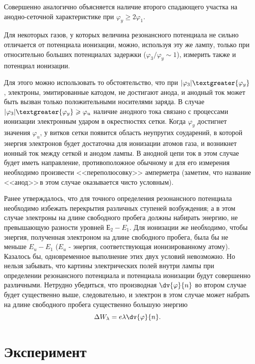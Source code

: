 Совершенно аналогично объясняется наличие второго спадающего участка на анодно-сеточной характеристике при $\varphi_{y}\geqslant2\varphi_{1}$.

Для некоторых газов, у которых величина резонансного потенциала не сильно отличается от потенциала ионизации, можно, используя эту же лампу, только при относительно больших потенциалах задержки ($\varphi_{3} /\varphi_{y} \sim1$), измерить также и потенциал ионизации.

Для этого можно использовать то обстоятельство, что при $|\varphi_{3}|\textgreater{\varphi_{y}}$, электроны, эмитированные катодом, не достигают анода, и анодный ток может быть вызван только положительными носителями заряда. В случае $|\varphi_{3}|\textgreater{\varphi_{y}}\geqslant{\varphi_{u}}$ наличие анодного тока связано с процессами ионизации электронным ударом в окрестностях сетки. Когда $\varphi_{y}$ достигнет значения $\varphi_{u}$, у витков сетки появится область неупругих соударений, в которой энергия электронов будет достаточна для ионизации атомов газа, и возникнет ионный ток между сеткой и анодом лампы. В анодной цепи ток в этом случае будет иметь направление, противоположное обычному и для его измерения необходимо произвести <<переполюсовку>> амперметра (заметим, что название <<анод>>\,в этом случае оказывается чисто условным).

Ранее утверждалось, что для точного определения резонансного потенциала необходимо избежать перекрытия различных ступеней возбуждения; а в этом случае электроны на длине свободного пробега должны набирать энергию, не превышающую разности уровней $\text{Е}_{2}-E_{1}$. Для ионизации же необходимо, чтобы энергия, полученная электроном на длине свободного пробега, была бы не меньше $E_{u}-E_1$ ($E_{u}$ - энергия, соответствующая ионизированному атому). Казалось бы, одновременное выполнение этих двух условий невозможно. Но нельзя забывать, что картины электрических полей внутри лампы при определении резонансного потенциала и потенциала ионизации будут совершенно различными. Нетрудно убедиться, что производная $\displaystyle\dv{\varphi}{n}$ во втором случае будет существенно выше, следовательно, и электрон в этом случае может набрать на длине свободного пробега существенно большую энергию $$\Delta W_{\lambda}=e\lambda \displaystyle\dv{\varphi}{n}.$$

\section{Эксперимент}

